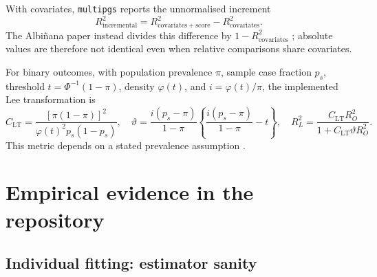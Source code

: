 \documentclass[10pt,a4paper]{article}
\newcommand{\pkg}[1]{\texttt{#1}}
\begin{document}
With covariates, \pkg{multipgs} reports the unnormalised increment
\begin{equation}
  R^2_{\mathrm{incremental}}
  =R^2_{\mathrm{covariates+score}}-R^2_{\mathrm{covariates}}.
  \label{eq:incremental-r2}
\end{equation}
The Albi\~nana paper instead divides this difference by
\(1-R^2_{\mathrm{covariates}}\) \cite{albinana2023}; absolute values are
therefore not identical even when relative comparisons share covariates.

For binary outcomes, with population prevalence \(\pi\), sample case fraction
\(p_s\), threshold \(t=\Phi^{-1}(1-\pi)\), density
\(\varphi(t)\), and \(i=\varphi(t)/\pi\), the implemented Lee transformation is
\begin{equation}
  C_{\mathrm{LT}}=
  \frac{[\pi(1-\pi)]^2}{\varphi(t)^2p_s(1-p_s)},
  \quad
  \vartheta=
  \frac{i(p_s-\pi)}{1-\pi}
  \left\{\frac{i(p_s-\pi)}{1-\pi}-t\right\},
  \quad
  R_L^2=
  \frac{C_{\mathrm{LT}}R_O^2}
       {1+C_{\mathrm{LT}}\vartheta R_O^2}.
  \label{eq:liability-r2}
\end{equation}
This metric depends on a stated prevalence assumption \cite{lee2012}.

\section{Empirical evidence in the repository}
\label{sec:evidence}

\subsection{Individual fitting: estimator sanity}
\end{document}
